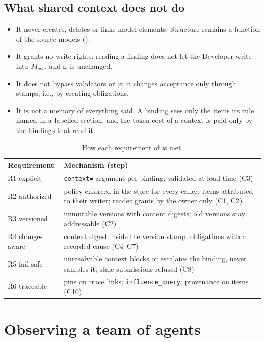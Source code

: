 \documentclass[10pt,a4paper]{article}
\newcommand{\code}[1]{\texttt{#1}}
\theoremstyle{definition}
\begin{document}
\subsection{What shared context does not do}

\begin{itemize}[nosep]
\item It never creates, deletes or links model elements. Structure remains a
function of the source models ().
\item It grants no write rights: reading a finding does not let the Developer
write into $M_{\mathit{sec}}$, and $\omega$ is unchanged.
\item It does not bypass validators or $\varphi$; it changes acceptance only
through stamps, i.e., by creating obligations.
\item It is not a memory of everything said. A binding sees only the items
its rule names, in a labelled section, and the token cost of a context is
paid only by the bindings that read it.
\end{itemize}

\begin{table}[h]
\centering\small
\caption{How each requirement of  is met.}
\label{tab:context-reqs}
\begin{tabularx}{\textwidth}{@{}l X@{}}
\toprule
Requirement & Mechanism (step) \\
\midrule
R1 explicit & \code{context=} argument per binding; validated at load time (C3) \\
R2 authorized & policy enforced in the store for every caller; items attributed to their writer; reader grants by the owner only (C1, C2) \\
R3 versioned & immutable versions with content digests; old versions stay addressable (C2) \\
R4 change-aware & context digest inside the version stamp; obligations with a recorded cause (C4--C7) \\
R5 fail-safe & unresolvable context blocks or escalates the binding, never samples it; stale submissions refused (C8) \\
R6 traceable & pins on trace links; \code{influence\_query}; provenance on items (C10) \\
\bottomrule
\end{tabularx}
\end{table}

\section{Observing a team of agents}\label{sec:obs}
\end{document}
